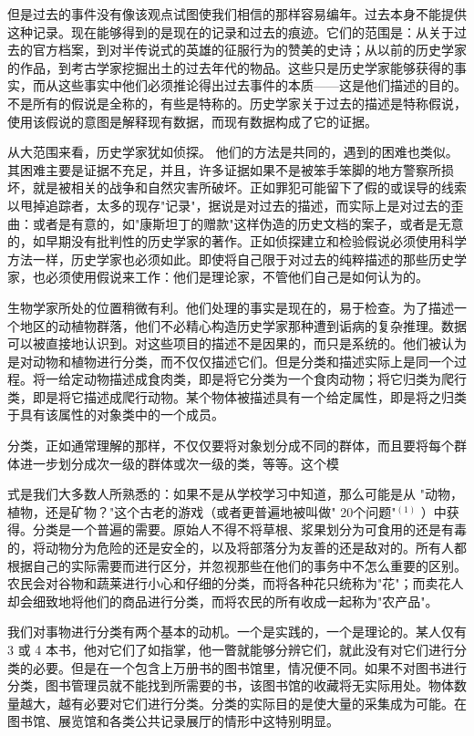 但是过去的事件没有像该观点试图使我们相信的那样容易编年。过去本身不能提供这种记录。现在能够得到的是现在的记录和过去的痕迹。它们的范围是：从关于过去的官方档案，到对半传说式的英雄的征服行为的赞美的史诗；从以前的历史学家的作品，到考古学家挖掘出土的过去年代的物品。这些只是历史学家能够获得的事实，而从这些事实中他们必须推论得出过去事件的本质——这是他们描述的目的。不是所有的假说是全称的，有些是特称的。历史学家关于过去的描述是特称假说，使用该假说的意图是解释现有数据，而现有数据构成了它的证据。

从大范围来看，历史学家犹如侦探。\cite{collingwood1939} 他们的方法是共同的，遇到的困难也类似。其困难主要是证据不充足，并且，许多证据如果不是被笨手笨脚的地方警察所损坏，就是被相关的战争和自然灾害所破坏。正如罪犯可能留下了假的或误导的线索以甩掉追踪者，太多的现存"记录"，据说是对过去的描述，而实际上是对过去的歪曲：或者是有意的，如"康斯坦丁的赠款"这样伪造的历史文档的案子，或者是无意的，如早期没有批判性的历史学家的著作。正如侦探建立和检验假说必须使用科学方法一样，历史学家也必须如此。即使将自己限于对过去的纯粹描述的那些历史学家，也必须使用假说来工作：他们是理论家，不管他们自己是如何认为的。

生物学家所处的位置稍微有利。他们处理的事实是现在的，易于检查。为了描述一个地区的动植物群落，他们不必精心构造历史学家那种遭到诟病的复杂推理。数据可以被直接地认识到。对这些项目的描述不是因果的，而只是系统的。他们被认为是对动物和植物进行分类，而不仅仅描述它们。但是分类和描述实际上是同一个过程。将一给定动物描述成食肉类，即是将它分类为一个食肉动物；将它归类为爬行类，即是将它描述成爬行动物。某个物体被描述具有一个给定属性，即是将之归类于具有该属性的对象类中的一个成员。

分类，正如通常理解的那样，不仅仅要将对象划分成不同的群体，而且要将每个群体进一步划分成次一级的群体或次一级的类，等等。这个模

式是我们大多数人所熟悉的：如果不是从学校学习中知道，那么可能是从 "动物，植物，还是矿物？"这个古老的游戏（或者更普遍地被叫做" 20个问题"${ }^{(1)}$ ）中获得。分类是一个普遍的需要。原始人不得不将草根、浆果划分为可食用的还是有毒的，将动物分为危险的还是安全的，以及将部落分为友善的还是敌对的。所有人都根据自己的实际需要而进行区分，并忽视那些在他们的事务中不怎么重要的区别。农民会对谷物和蔬莱进行小心和仔细的分类，而将各种花只统称为"花"；而卖花人却会细致地将他们的商品进行分类，而将农民的所有收成一起称为"农产品"。

我们对事物进行分类有两个基本的动机。一个是实践的，一个是理论的。某人仅有 3 或 4 本书，他对它们了如指掌，他一瞥就能够分辨它们，就此没有对它们进行分类的必要。但是在一个包含上万册书的图书馆里，情况便不同。如果不对图书进行分类，图书管理员就不能找到所需要的书，该图书馆的收藏将无实际用处。物体数量越大，越有必要对它们进行分类。分类的实际目的是使大量的采集成为可能。在图书馆、展览馆和各类公共记录展厅的情形中这特别明显。

